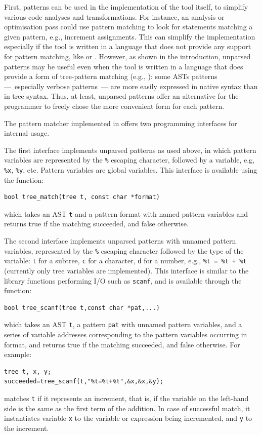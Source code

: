 First, patterns can be used in the implementation of the tool itself,
to simplify various code analyses and transformations. For instance,
an analysis or optimisation pass could use pattern matching to look
for statements matching a given pattern, e.g., increment assignments.
This can simplify the implementation especially if the tool is written
in a language that does not provide any support for pattern matching,
like \Clang or \Java. However, as shown in the introduction, unparsed
patterns may be useful even when the tool is written in a language
that does provide a form of tree\hyp{}pattern matching (e.g., \ML):
some ASTs patterns ---~especially verbose patterns~--- are more easily
expressed in native syntax than in tree syntax. Thus, at least,
unparsed patterns offer an alternative for the programmer to freely
chose the more convenient form for each pattern.

The pattern matcher implemented in \MyGCC offers two programming
interfaces for internal usage.

The first interface implements unparsed patterns as used above, in
which pattern variables are represented by the \texttt{\%} escaping
character, followed by a variable, e.g, \texttt{\%x}, \texttt{\%y},
etc. Pattern variables are global variables. This interface is
available using the \Clang function:
\begin{verbatim}
bool tree_match(tree t, const char *format)
\end{verbatim}
which takes an AST \texttt{t} and a pattern format with named
pattern variables and returns true if the matching succeeded, and
false otherwise.

The second interface implements unparsed patterns with unnamed pattern
variables, represented by the \texttt{\%} escaping character followed
by the type of the variable: \texttt{t} for a subtree, \texttt{c} for
a character, \texttt{d} for a number, e.g., \texttt{\%t = \%t + \%t}
(currently only tree variables are implemented). This interface is
similar to the \Clang library functions performing I/O such as
\texttt{scanf}, and is available through the \Clang function:
\begin{verbatim}
bool tree_scanf(tree t,const char *pat,...)
\end{verbatim}
which takes an AST \texttt{t}, a pattern \texttt{pat} with unnamed
pattern variables, and a series of variable addresses corresponding to
the pattern variables occurring in format, and returns true if the
matching succeeded, and false otherwise. For example:
\begin{verbatim}
tree t, x, y;
succeeded=tree_scanf(t,"%t=%t+%t",&x,&x,&y);
\end{verbatim}
matches \texttt{t} if it represents an increment, that is, if the
variable on the left\hyp{}hand side is the same as the first term of
the addition. In case of successful match, it instantiates variable
\texttt{x} to the variable or expression being incremented, and
\texttt{y} to the increment.

